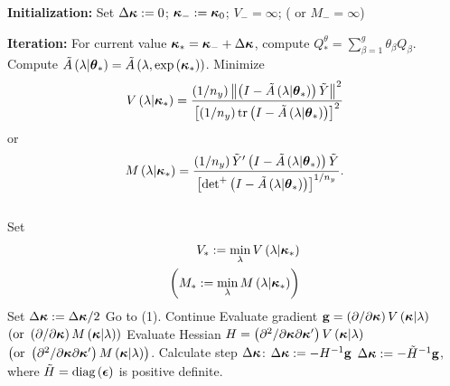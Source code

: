 \begin{algorithm}[H]
\caption{ }
\begin{algorithmic}
\STATE \textbf{Initialization:} 
	\STATE Set $\Delta \mbox{\boldmath $\kappa$} := 0$; \;$\mbox{\boldmath $\kappa$}_{-}:=\mbox{\boldmath $\kappa$}_{0}$; \;$V_- = \infty$; \;( or $M_- = \infty$)

\STATE \textbf{Iteration:} 
		\STATE For current value $\mbox{\boldmath $\kappa$}_* = \mbox{\boldmath $\kappa$}_- + \Delta \mbox{\boldmath $\kappa$}$, compute $Q_*^\theta = \sum_{\beta = 1}^g \theta_\beta Q_\beta$. 
		\STATE Compute $\tilde{A}\left(\lambda \vert \mbox{\boldmath $\theta$}_* \right) = \tilde{A}\left(\lambda, \exp\left({\mbox{\boldmath $\kappa$}_*} \right)\right)$.
		\STATE Minimize \begin{equation*} V\left(\lambda \vert \mbox{\boldmath $\kappa$}_* \right) = \frac{\left( 1/n_y \right)  \left \lVert \left(I - \tilde{A}\left(\lambda \vert \mbox{\boldmath $\theta$}_* \right)\right) \tilde{Y} \right\rVert^2}{\left[\left( 1/n_y \right) \textup{tr} \left(I - \tilde{A}\left(\lambda \vert \mbox{\boldmath $\theta$}_* \right)\right)  \right]^2} \end{equation*} or  \begin{equation*} 
	M\left(\lambda \vert \mbox{\boldmath $\kappa$}_* \right) = \frac{\left( 1/n_y \right) \tilde{Y}' \left(I - \tilde{A} \left(\lambda \vert \mbox{\boldmath $\theta$}_* \right)\right) \tilde{Y} }{\left[ \mbox{det}^+\left(I - \tilde{A}\left(\lambda \vert \mbox{\boldmath $\theta$}_* \right)\right)  \right]^{1/n_y}}.\end{equation*} \\
			Set 
			\begin{align*}
			V_* := \min \limits_\lambda V\left( \lambda \vert \mbox{\boldmath $\kappa$}_* \right) \\
			\left( M_* := \min \limits_\lambda M\left(\lambda \vert \mbox{\boldmath $\kappa$}_* \right) \right)
			\end{align*}
		 		\STATE Set $\Delta \mbox{\boldmath $\kappa$} := \Delta \mbox{\boldmath $\kappa$}/2$
		 		\STATE Go to (1).
		\ELSE
		\STATE Continue
		\ENDIF
		\STATE Evaluate gradient $\mathbf{g} = \left(\partial /\partial \mbox{\boldmath $\kappa$}\right) V\left(\mbox{\boldmath $\kappa$} \vert \lambda\right)$ $\left(\mbox{or }\left(\partial /\partial \mbox{\boldmath $\kappa$}\right) M\left(\mbox{\boldmath $\kappa$} \vert \lambda\right) \right)$
		\STATE Evaluate Hessian $H = \left(\partial^2 /\partial \mbox{\boldmath $\kappa$}\partial \mbox{\boldmath $\kappa$}' \right) V\left(\mbox{\boldmath $\kappa$} \vert \lambda\right)$ $\left(\mbox{or } \left(\partial^2 /\partial \mbox{\boldmath $\kappa$}\partial \mbox{\boldmath $\kappa$}' \right) M\left(\mbox{\boldmath $\kappa$} \vert \lambda \right) \right)$.
		\STATE Calculate step $\Delta \mbox{\boldmath $\kappa$}$:
				\STATE $\Delta \mbox{\boldmath $\kappa$} := -H^{-1} \mathbf{g}$
			\ELSE
				\STATE $\Delta \mbox{\boldmath $\kappa$} := -\tilde{H}^{-1} \mathbf{g}$, where $\tilde{H} = \textup{diag}\left(\mbox{\boldmath $\epsilon$}\right)$ is positive definite.

\end{algorithmic}
\end{algorithm}
